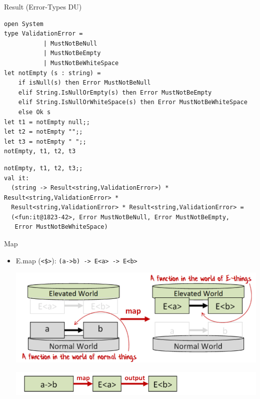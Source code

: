 \documentclass[t]{beamer}
\begin{document}
\begin{frame}[label={sec:org8fa98fb},fragile]{Result (Error-Types DU)}
 \begin{verbatim}
open System
type ValidationError =
           | MustNotBeNull
           | MustNotBeEmpty
           | MustNotBeWhiteSpace
let notEmpty (s : string) =
    if isNull(s) then Error MustNotBeNull
    elif String.IsNullOrEmpty(s) then Error MustNotBeEmpty
    elif String.IsNullOrWhiteSpace(s) then Error MustNotBeWhiteSpace
    else Ok s
let t1 = notEmpty null;;
let t2 = notEmpty "";;
let t3 = notEmpty " ";;
notEmpty, t1, t2, t3
\end{verbatim}

\begin{verbatim}
notEmpty, t1, t2, t3;;
val it:
  (string -> Result<string,ValidationError>) * Result<string,ValidationError> *
  Result<string,ValidationError> * Result<string,ValidationError> =
  (<fun:it@1823-42>, Error MustNotBeNull, Error MustNotBeEmpty,
   Error MustNotBeWhiteSpace)
\end{verbatim}
\end{frame}

\begin{frame}[label={sec:org27f0cbb},fragile]{Map}
 \begin{itemize}
\item E.map (\texttt{<\$>}): \texttt{(a->b) -> E<a> -> E<b>}
\begin{center}
\includegraphics[width=.9\linewidth]{./../img/vgfp_map.png}
\end{center}
\begin{center}
\includegraphics[width=.9\linewidth]{./../img/vgfp_map2.png}
\end{center}
\end{itemize}
\end{frame}
\end{document}
